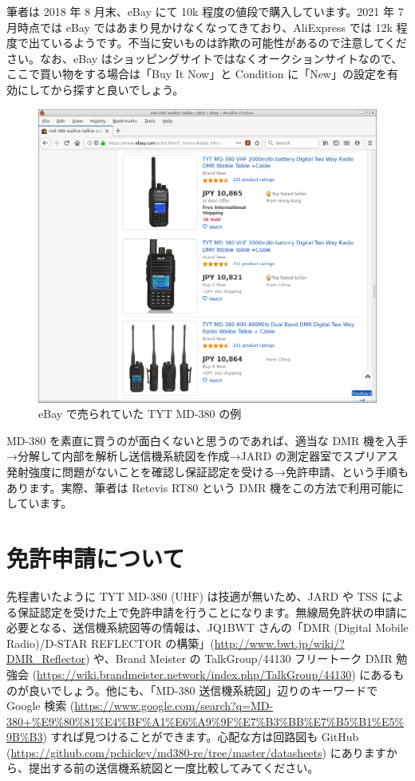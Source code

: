 \documentclass[a4j,oneside]{ujbook}
\begin{document}
筆者は 2018 年 8 月末、eBay にて \yen10k 程度の値段で購入しています。2021 年 7 月時点では eBay ではあまり見かけなくなってきており、AliExpress では \yen12k 程度で出ているようです。不当に安いものは詐欺の可能性があるので注意してください。なお、eBay はショッピングサイトではなくオークションサイトなので、ここで買い物をする場合は「Buy It Now」と Condition に「New」の設定を有効にしてから探すと良いでしょう。
\begin{figure}[H]
 \centering
 \includegraphics[width=15cm]{img/md380-ebay.png}
 \caption{eBay で売られていた TYT MD-380 の例}
\end{figure}
MD-380 を素直に買うのが面白くないと思うのであれば、適当な DMR 機を入手→分解して内部を解析し送信機系統図を作成→JARD の測定器室でスプリアス発射強度に問題がないことを確認し保証認定を受ける→免許申請、という手順もあります。実際、筆者は Retevis RT80 という DMR 機をこの方法で利用可能にしています。

\section{免許申請について}

先程書いたように TYT MD-380 (UHF) は技適が無いため、JARD や TSS による保証認定を受けた上で免許申請を行うことになります。無線局免許状の申請に必要となる、送信機系統図等の情報は、JQ1BWT さんの「DMR (Digital Mobile Radio)/D-STAR REFLECTOR の構築」(\url{http://www.bwt.jp/wiki/?DMR_Reflector}) や、Brand Meister の TalkGroup/44130 フリートーク DMR 勉強会 (\url{https://wiki.brandmeister.network/index.php/TalkGroup/44130}) にあるものが良いでしょう。他にも、「MD-380 送信機系統図」辺りのキーワードで Google 検索 (\url{https://www.google.com/search?q=MD-380+%E9%80%81%E4%BF%A1%E6%A9%9F%E7%B3%BB%E7%B5%B1%E5%9B%B3}) すれば見つけることができます。心配な方は回路図も GitHub (\url{https://github.com/pchickey/md380-re/tree/master/datasheets}) にありますから、提出する前の送信機系統図と一度比較してみてください。
\end{document}
